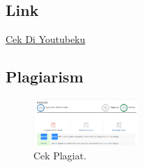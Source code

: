 \subsection{Link}
\href{https://www.youtube.com/watch?v=HGscljVrxrE&feature=youtu.be}{Cek Di Youtubeku}

\subsection{Plagiarism}
\begin{figure}[Cek Plagiat]
	\includegraphics[width=4cm]{figures/1174008/pelagiat.png}
	\centering
	\caption{Cek Plagiat.}
\end{figure}
